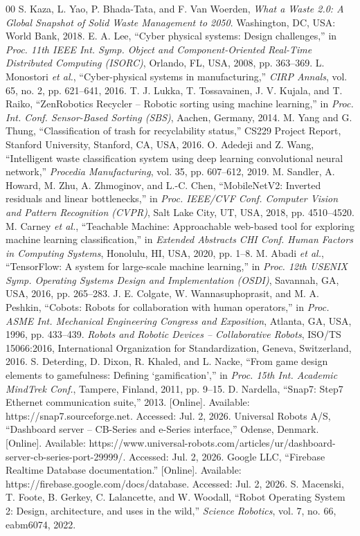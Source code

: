 \documentclass[conference]{IEEEtran}
\begin{document}
\begin{thebibliography}{00}
 S. Kaza, L. Yao, P. Bhada-Tata, and F. Van Woerden, \emph{What a Waste 2.0: A Global Snapshot of Solid Waste Management to 2050}. Washington, DC, USA: World Bank, 2018.
 E. A. Lee, ``Cyber physical systems: Design challenges,'' in \emph{Proc. 11th IEEE Int. Symp. Object and Component-Oriented Real-Time Distributed Computing (ISORC)}, Orlando, FL, USA, 2008, pp. 363--369.
 L. Monostori \emph{et al.}, ``Cyber-physical systems in manufacturing,'' \emph{CIRP Annals}, vol. 65, no. 2, pp. 621--641, 2016.
 T. J. Lukka, T. Tossavainen, J. V. Kujala, and T. Raiko, ``ZenRobotics Recycler -- Robotic sorting using machine learning,'' in \emph{Proc. Int. Conf. Sensor-Based Sorting (SBS)}, Aachen, Germany, 2014.
 M. Yang and G. Thung, ``Classification of trash for recyclability status,'' CS229 Project Report, Stanford University, Stanford, CA, USA, 2016.
 O. Adedeji and Z. Wang, ``Intelligent waste classification system using deep learning convolutional neural network,'' \emph{Procedia Manufacturing}, vol. 35, pp. 607--612, 2019.
 M. Sandler, A. Howard, M. Zhu, A. Zhmoginov, and L.-C. Chen, ``MobileNetV2: Inverted residuals and linear bottlenecks,'' in \emph{Proc. IEEE/CVF Conf. Computer Vision and Pattern Recognition (CVPR)}, Salt Lake City, UT, USA, 2018, pp. 4510--4520.
 M. Carney \emph{et al.}, ``Teachable Machine: Approachable web-based tool for exploring machine learning classification,'' in \emph{Extended Abstracts CHI Conf. Human Factors in Computing Systems}, Honolulu, HI, USA, 2020, pp. 1--8.
 M. Abadi \emph{et al.}, ``TensorFlow: A system for large-scale machine learning,'' in \emph{Proc. 12th USENIX Symp. Operating Systems Design and Implementation (OSDI)}, Savannah, GA, USA, 2016, pp. 265--283.
 J. E. Colgate, W. Wannasuphoprasit, and M. A. Peshkin, ``Cobots: Robots for collaboration with human operators,'' in \emph{Proc. ASME Int. Mechanical Engineering Congress and Exposition}, Atlanta, GA, USA, 1996, pp. 433--439.
 \emph{Robots and Robotic Devices -- Collaborative Robots}, ISO/TS 15066:2016, International Organization for Standardization, Geneva, Switzerland, 2016.
 S. Deterding, D. Dixon, R. Khaled, and L. Nacke, ``From game design elements to gamefulness: Defining `gamification','' in \emph{Proc. 15th Int. Academic MindTrek Conf.}, Tampere, Finland, 2011, pp. 9--15.
 D. Nardella, ``Snap7: Step7 Ethernet communication suite,'' 2013. [Online]. Available: https://snap7.sourceforge.net. Accessed: Jul. 2, 2026.
 Universal Robots A/S, ``Dashboard server -- CB-Series and e-Series interface,'' Odense, Denmark. [Online]. Available: https://www.universal-robots.com/articles/ur/dashboard-server-cb-series-port-29999/. Accessed: Jul. 2, 2026.
 Google LLC, ``Firebase Realtime Database documentation.'' [Online]. Available: https://firebase.google.com/docs/database. Accessed: Jul. 2, 2026.
 S. Macenski, T. Foote, B. Gerkey, C. Lalancette, and W. Woodall, ``Robot Operating System 2: Design, architecture, and uses in the wild,'' \emph{Science Robotics}, vol. 7, no. 66, eabm6074, 2022.
\end{thebibliography}
\end{document}
